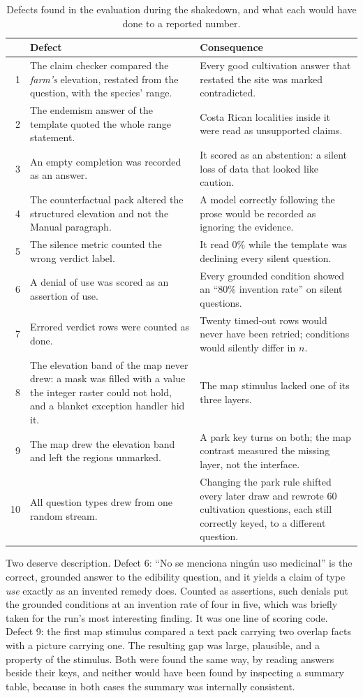 \documentclass[11pt,a4paper]{article}
\begin{document}
\begin{table}[htbp]
\centering
\caption{Defects found in the evaluation during the shakedown, and what each would
have done to a reported number.}
\label{tab:defects}
\small
\begin{tabularx}{\textwidth}{rXX}
\toprule
 & Defect & Consequence \\
\midrule
1 & The claim checker compared the \emph{farm's} elevation, restated from the question, with the species' range. & Every good cultivation answer that restated the site was marked contradicted. \\
2 & The endemism answer of the template quoted the whole range statement. & Costa Rican localities inside it were read as unsupported claims. \\
3 & An empty completion was recorded as an answer. & It scored as an abstention: a silent loss of data that looked like caution. \\
4 & The counterfactual pack altered the structured elevation and not the Manual paragraph. & A model correctly following the prose would be recorded as ignoring the evidence. \\
5 & The silence metric counted the wrong verdict label. & It read 0\% while the template was declining every silent question. \\
6 & A denial of use was scored as an assertion of use. & Every grounded condition showed an ``80\% invention rate'' on silent questions. \\
7 & Errored verdict rows were counted as done. & Twenty timed-out rows would never have been retried; conditions would silently differ in $n$. \\
8 & The elevation band of the map never drew: a mask was filled with a value the integer raster could not hold, and a blanket exception handler hid it. & The map stimulus lacked one of its three layers. \\
9 & The map drew the elevation band and left the regions unmarked. & A park key turns on both; the map contrast measured the missing layer, not the interface. \\
10 & All question types drew from one random stream. & Changing the park rule shifted every later draw and rewrote 60 cultivation questions, each still correctly keyed, to a different question. \\
\bottomrule
\end{tabularx}
\end{table}

Two deserve description. Defect 6: ``No se menciona ningún uso medicinal'' is the
correct, grounded answer to the edibility question, and it yields a claim of type
\emph{use} exactly as an invented remedy does. Counted as assertions, such denials
put the grounded conditions at an invention rate of four in five, which was briefly
taken for the run's most interesting finding. It was one line of scoring code.
Defect 9: the first map stimulus compared a text pack carrying two overlap facts with
a picture carrying one. The resulting gap was large, plausible, and a property of the
stimulus. Both were found the same way, by reading answers beside their keys, and
neither would have been found by inspecting a summary table, because in both cases
the summary was internally consistent.
\end{document}
